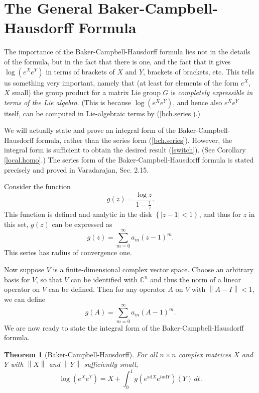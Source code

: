 \documentclass[12pt]{amsbook}
\theoremstyle{plain}
\newtheorem{theorem}{Theorem}
\numberwithin{equation}{chapter}
\numberwithin{theorem}{chapter}
\begin{document}
\section{The General Baker-Campbell-Hausdorff Formula\label{bch.general}}

The importance of the Baker-Campbell-Hausdorff formula lies not in the details
of the formula, but in the fact that there is one, and the fact that it gives
$\log(e^{X}e^{Y})$ in terms of brackets of $X$ and $Y$, brackets of brackets,
etc. This tells us something very important, namely that (at least for
elements of the form $e^{X}$, $X$ small) the group product for a matrix Lie
group $G$ is \textit{completely expressible in terms of the Lie algebra}.
(This is because $\log\left(  e^{X}e^{Y}\right)  $, and hence also $e^{X}%
e^{Y}$ itself, can be computed in Lie-algebraic terms by (\ref{bch.series}).)

We will actually state and prove an integral form of the
Baker-Campbell-Hausdorff formula, rather than the series form
(\ref{bch.series}). However, the integral form is sufficient to obtain the
desired result (\ref{switch}). (See Corollary \ref{local.homo}.) The series
form of the Baker-Campbell-Hausdorff formula is stated precisely and proved in
Varadarajan, Sec. 2.15.

Consider the function
\[
g(z)=\frac{\log z}{1-\frac1z}\text{.}%
\]
This function is defined and analytic in the disk $\left\{  \left|
z-1\right|  <1\right\}  $, and thus for $z$ in this set, $g(z)$ can be
expressed as
\[
g(z)=\sum_{m=0}^{\infty}a_{m}(z-1)^{m}\text{.}%
\]
This series has radius of convergence one.

Now suppose $V$ is a finite-dimensional complex vector space. Choose an
arbitrary basis for $V$, so that $V$ can be identified with $\mathbb{C}^{n}$
and thus the norm of a linear operator on $V$ can be defined. Then for any
operator $A$ on $V$ with $\left\|  A-I\right\|  <1$, we can define
\[
g(A)=\sum_{m=0}^{\infty}a_{m}(A-1)^{m}\text{.}%
\]
We are now ready to state the integral form of the Baker-Campbell-Hausdorff formula.

\begin{theorem}
[Baker-Campbell-Hausdorff]\label{bch.theorem}For all $n\times n$ complex
matrices $X$ and $Y$ with $\left\|  X\right\|  $ and $\left\|  Y\right\|  $
sufficiently small,
\begin{equation}
\log\left(  e^{X}e^{Y}\right)  =X+\int_{0}^{1}g(e^{\mathrm{ad}X}%
e^{t\mathrm{ad}Y})(Y)\,dt\text{.}\label{bch.integral}%
\end{equation}
\end{theorem}
\end{document}
